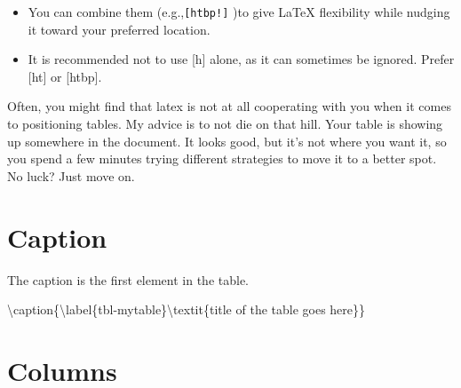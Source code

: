 \documentclass[
  letterpaper,
  DIV=11,
  numbers=noendperiod]{scrreprt}
\newenvironment{Shaded}{\begin{snugshade}}{\end{snugshade}}
\newcommand{\NormalTok}[1]{\textcolor[rgb]{0.00,0.23,0.31}{#1}}
\begin{document}
\begin{itemize}
\item
  You can combine them (e.g.,\texttt{{[}htbp!{]}} )to give LaTeX
  flexibility while nudging it toward your preferred location.
\item
  It is recommended not to use {[}h{]} alone, as it can sometimes be
  ignored. Prefer {[}ht{]} or {[}htbp{]}.
\end{itemize}

\begin{tcolorbox}[enhanced jigsaw, opacityback=0, toprule=.15mm, titlerule=0mm, colbacktitle=quarto-callout-tip-color!10!white, bottomrule=.15mm, colframe=quarto-callout-tip-color-frame, breakable, opacitybacktitle=0.6, coltitle=black, toptitle=1mm, left=2mm, bottomtitle=1mm, title=\textcolor{quarto-callout-tip-color}{\faLightbulb}\hspace{0.5em}{Do not fight LaTeX}, arc=.35mm, rightrule=.15mm, leftrule=.75mm, colback=white]

Often, you might find that latex is not at all cooperating with you when
it comes to positioning tables. My advice is to not die on that hill.
Your table is showing up somewhere in the document. It looks good, but
it's not where you want it, so you spend a few minutes trying different
strategies to move it to a better spot. No luck? Just move on.

\end{tcolorbox}

\section*{Caption}\label{caption}


The caption is the first element in the table.

\begin{Shaded}
\begin{Highlighting}[]
\NormalTok{\textbackslash{}caption\{\textbackslash{}label\{tbl{-}mytable\}\textbackslash{}textit\{title of the table goes here\}\}}
\end{Highlighting}
\end{Shaded}

\section*{Columns}\label{columns}
\end{document}
